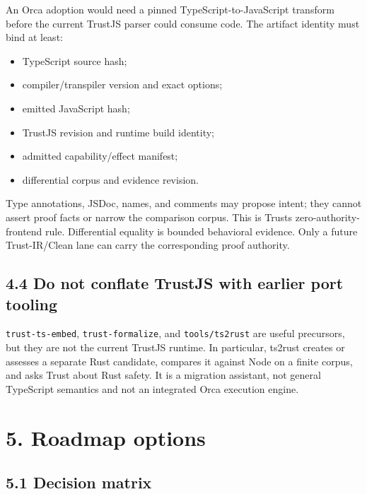 \documentclass[
  10pt,
  letterpaper,
]{article}
\providecommand{\tightlist}{%
  \setlength{\itemsep}{0pt}\setlength{\parskip}{0pt}}
\begin{document}
An Orca adoption would need a pinned TypeScript-to-JavaScript transform
before the current TrustJS parser could consume code. The artifact
identity must bind at least:

\begin{itemize}
\tightlist
\item
  TypeScript source hash;
\item
  compiler/transpiler version and exact options;
\item
  emitted JavaScript hash;
\item
  TrustJS revision and runtime build identity;
\item
  admitted capability/effect manifest;
\item
  differential corpus and evidence revision.
\end{itemize}

Type annotations, JSDoc, names, and comments may propose intent; they
cannot assert proof facts or narrow the comparison corpus. This is
Trust\textquotesingle s zero-authority-frontend rule. Differential
equality is bounded behavioral evidence. Only a future Trust-IR/Clean
lane can carry the corresponding proof authority.

\subsection{4.4 Do not conflate TrustJS with earlier port
tooling}\label{44-do-not-conflate-trustjs-with-earlier-port-tooling}

\texttt{trust-ts-embed}, \texttt{trust-formalize}, and
\texttt{tools/ts2rust} are useful precursors, but they are not the
current TrustJS runtime. In particular, ts2rust creates or assesses a
separate Rust candidate, compares it against Node on a finite corpus,
and asks Trust about Rust safety. It is a migration assistant, not
general TypeScript semantics and not an integrated Orca execution
engine.

\section{5. Roadmap options}\label{5-roadmap-options}

\subsection{5.1 Decision matrix}\label{51-decision-matrix}
\end{document}
